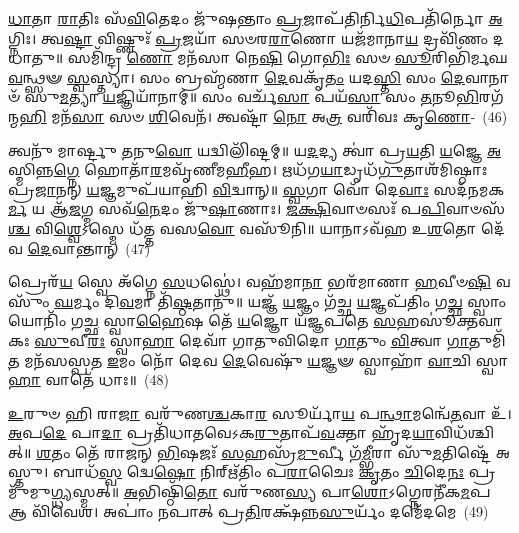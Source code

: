 {\anuvakamend[{\-\ul{𑌰𑍂}\-𑌪𑍇𑌣᳴ 𑌸\-\ul{𑌦}\-𑌸𑍍𑌯𑍈᳴\-\ul{𑌰}\-𑌷𑍍𑌟𑌾𑌦᳴𑌶 𑌚}]}%

\-\ul{𑌧𑌾}\-𑌤𑌾 \ul{𑌰𑌾}\-𑌤𑌿𑌃 𑌸᳴\-\ul{𑌵𑌿}\-𑌤𑍇𑌦𑌂 𑌜𑍁᳴𑌷𑌨𑍍𑌤𑌾𑌂 \ul{𑌪𑍍𑌰}\-𑌜𑌾𑌪᳴𑌤𑌿𑌰𑍍𑌨𑌿\-\ul{𑌧𑌿}\-𑌪𑌤𑌿᳴𑌰𑍍𑌨𑍋 \ul{𑌅}\-𑌗𑍍𑌨𑌿𑌃। 𑌤𑍍𑌵\-\ul{𑌷𑍍𑌟𑌾} 𑌵𑌿𑌷𑍍𑌣𑍁𑌃᳴ \ul{𑌪𑍍𑌰}\-𑌜𑌯𑌾᳴ 𑌸𑍞𑌰\-\ul{𑌰𑌾}\-𑌣𑍋 𑌯𑌜᳴𑌮𑌾𑌨𑌾\-\ul{𑌯} 𑌦𑍍𑌰𑌵𑌿᳴𑌣𑌂 𑌦𑌧𑌾𑌤𑍁॥ 𑌸𑌮𑌿᳴𑌨𑍍𑌦𑍍𑌰 \ul{𑌣𑍋} 𑌮𑌨᳴𑌸𑌾 𑌨𑍇\-\ul{𑌷𑌿} 𑌗𑍋\-\ul{𑌭𑌿𑌃} 𑌸𑍞 \ul{𑌸𑍂}\-𑌰𑌿𑌭𑌿᳴𑌰𑍍𑌮𑌘\-\ul{𑌵}\-𑌨𑍍𑌥𑍍𑌸𑍟 \ul{𑌸𑍍𑌵}\-𑌸𑍍𑌤𑍍𑌯𑌾। 𑌸𑌂 𑌬𑍍𑌰𑌹𑍍𑌮᳴𑌣𑌾 \ul{𑌦𑍇}\-𑌵𑌕𑍃᳴\-\ul{𑌤𑌂} 𑌯𑌦\-\ul{𑌸𑍍𑌤𑌿} 𑌸𑌂 \ul{𑌦𑍇}\-𑌵𑌾𑌨𑌾𑍞᳴ 𑌸𑍁\-\ul{𑌮}\-𑌤𑍍𑌯𑌾 \ul{𑌯}\-𑌜𑍍𑌞𑌿𑌯𑌾᳴𑌨𑌾𑌮𑍍॥ 𑌸𑌂 𑌵𑌰𑍍𑌚᳴\-\ul{𑌸𑌾} 𑌪𑌯᳴\-\ul{𑌸𑌾} 𑌸𑌂 \ul{𑌤}\-𑌨𑍂\-\ul{𑌭𑌿}\-𑌰𑌗᳴𑌨𑍍𑌮\-\ul{𑌹𑌿} 𑌮𑌨᳴\-\ul{𑌸𑌾} 𑌸𑍞 \ul{𑌶𑌿}\-𑌵𑍇𑌨᳴। 𑌤𑍍𑌵𑌷𑍍𑌟𑌾᳴ \ul{𑌨𑍋} 𑌅\-\ul{𑌤𑍍𑌰} 𑌵𑌰𑌿᳴𑌵𑌃 𑌕𑍃\-\ul{𑌣𑍋}\--~(46)

𑌤𑍍𑌵𑌨𑍁᳴ 𑌮𑌾𑌰𑍍𑌷𑍍𑌟𑍁 \ul{𑌤}\-𑌨𑍁\-\ul{𑌵𑍋} 𑌯𑌦𑍍𑌵𑌿𑌲𑌿᳴𑌷𑍍𑌟𑌮𑍍॥ 𑌯\-\ul{𑌦}\-𑌦𑍍𑌯 𑌤𑍍𑌵𑌾॑ 𑌪𑍍𑌰\-\ul{𑌯}\-𑌤𑌿 \ul{𑌯}\-𑌜𑍍𑌞𑍇 \ul{𑌅}\-𑌸𑍍𑌮𑌿𑌨𑍍𑌨\-\ul{𑌗𑍍𑌨𑍇} 𑌹𑍋𑌤𑌾᳴\-\ul{𑌰}\-𑌮𑌵𑍃᳴𑌣𑍀𑌮\-\ul{𑌹𑍀}\-𑌹। 𑌋𑌧᳴𑌗\-\ul{𑌯𑌾}\-𑌡𑍃𑌧᳴\-\ul{𑌗𑍁}\-𑌤𑌾𑌶᳴𑌮𑌿𑌷𑍍𑌠𑌾𑌃 𑌪𑍍𑌰\-\ul{𑌜𑌾}\-𑌨𑌨𑍍 \ul{𑌯}\-𑌜𑍍𑌞𑌮𑍁𑌪᳴𑌯𑌾𑌹𑌿 \ul{𑌵𑌿}\-𑌦𑍍𑌵𑌾𑌨𑍍॥ \ul{𑌸𑍍𑌵}\-𑌗𑌾 𑌵𑍋᳴ 𑌦𑍇\-\ul{𑌵𑌾𑌃} 𑌸𑌦᳴𑌨𑌮𑌕\-\ul{𑌰𑍍𑌮} 𑌯 𑌆᳴\-\ul{𑌜}\-𑌗𑍍𑌮 𑌸𑌵᳴\-\ul{𑌨𑍇}\-𑌦𑌂 𑌜𑍁᳴\-\ul{𑌷𑌾}\-𑌣𑌾𑌃। \ul{𑌜}\-\-\ul{𑌕𑍍𑌷𑌿}\-𑌵𑌾𑍞𑌸𑌃᳴ 𑌪\-\ul{𑌪𑌿}\-𑌵𑌾𑍞𑌸᳴\-\ul{𑌶𑍍𑌚} 𑌵𑌿\-\ul{𑌶𑍍𑌵𑍇}\-\-𑌽𑌸𑍍𑌮𑍇 𑌧᳴𑌤𑍍𑌤 𑌵𑌸\-\ul{𑌵𑍋} 𑌵𑌸𑍂᳴𑌨𑌿॥ 𑌯𑌾𑌨𑌾\-𑌽𑌵᳴𑌹 𑌉\-\ul{𑌶}\-𑌤𑍋 𑌦𑍇᳴𑌵 \ul{𑌦𑍇}\-𑌵𑌾𑌨𑍍𑌤𑌾𑌨𑍍~(47)

𑌪𑍍𑌰𑍇𑌰᳴\-\ul{𑌯} 𑌸𑍍𑌵𑍇 𑌅᳴𑌗𑍍𑌨𑍇 \ul{𑌸}\-𑌧𑌸𑍍𑌥𑍇॑। 𑌵𑌹᳴𑌮𑌾\-\ul{𑌨𑌾} 𑌭𑌰᳴𑌮𑌾𑌣𑌾 \ul{𑌹}\-𑌵𑍀𑍞\-\ul{𑌷𑌿} 𑌵𑌸𑍁𑌂᳴ \ul{𑌘}\-𑌰𑍍𑌮𑌂 𑌦𑌿\-\ul{𑌵}\-𑌮𑌾 𑌤𑌿᳴\-\ul{𑌷𑍍𑌠}\-𑌤𑌾𑌨𑍁᳴॥ 𑌯𑌜𑍍𑌞᳴ \ul{𑌯}\-𑌜𑍍𑌞𑌂 𑌗᳴𑌚𑍍𑌛 \ul{𑌯}\-𑌜𑍍𑌞𑌪᳴𑌤𑌿𑌂 𑌗\-\ul{𑌚𑍍𑌛} 𑌸𑍍𑌵𑌾𑌂 𑌯𑍋𑌨𑌿𑌂᳴ 𑌗\-\ul{𑌚𑍍𑌛} 𑌸𑍍𑌵𑌾\-\ul{𑌹𑍈}\-𑌷 𑌤𑍇᳴ \ul{𑌯}\-𑌜𑍍𑌞𑍋 𑌯᳴𑌜𑍍𑌞𑌪𑌤𑍇 \ul{𑌸}\-𑌹𑌸𑍂॑𑌕𑍍𑌤𑌵𑌾𑌕𑌃 \ul{𑌸𑍁}\-𑌵𑍀\-\ul{𑌰𑌃} 𑌸𑍍𑌵𑌾\-\ul{𑌹𑌾} 𑌦𑍇𑌵𑌾᳴ 𑌗𑌾𑌤𑍁𑌵𑌿𑌦𑍋 \ul{𑌗𑌾}\-𑌤𑍁𑌂 \ul{𑌵𑌿}\-𑌤𑍍𑌵𑌾 \ul{𑌗𑌾}\-𑌤𑍁𑌮𑌿᳴\-\ul{𑌤} 𑌮𑌨᳴𑌸𑌸𑍍𑌪𑌤 \ul{𑌇}\-𑌮𑌂 𑌨𑍋᳴ 𑌦𑍇𑌵 \ul{𑌦𑍇}\-𑌵𑍇𑌷𑍁᳴ \ul{𑌯}\-𑌜𑍍𑌞𑍟 𑌸𑍍𑌵𑌾𑌹𑌾᳴ \ul{𑌵𑌾}\-𑌚𑌿 𑌸𑍍𑌵𑌾\-\ul{𑌹𑌾} 𑌵𑌾𑌤𑍇᳴ 𑌧𑌾𑌃॥~(48)

{\anuvakamend[{\-\ul{𑌕𑍃}\-\-\ul{𑌣𑍋}\-\-\ul{𑌤𑍁} 𑌤𑌾\-\ul{𑌨}\-𑌷𑍍𑌟𑌾𑌚᳴𑌤𑍍𑌵𑌾𑌰𑌿𑍞𑌶𑌚𑍍𑌚}]}%

\-\ul{𑌉}\-𑌰𑍁𑍞 𑌹𑌿 𑌰𑌾\-\ul{𑌜𑌾} 𑌵𑌰𑍁᳴𑌣\-\ul{𑌶𑍍𑌚}\-𑌕𑌾\-\ul{𑌰} 𑌸𑍂𑌰𑍍𑌯𑌾᳴\-\ul{𑌯} 𑌪\-\ul{𑌨𑍍𑌥𑌾}\-𑌮𑌨𑍍𑌵𑍇᳴\-\ul{𑌤}\-𑌵𑌾 𑌉᳴। \ul{𑌅}\-𑌪\-\ul{𑌦𑍇} 𑌪𑌾\-\ul{𑌦𑌾} 𑌪𑍍𑌰𑌤𑌿᳴𑌧𑌾𑌤𑌵𑍇\-𑌽𑌕\-\ul{𑌰𑍁}\-𑌤𑌾𑌪᳴\-\ul{𑌵}\-𑌕𑍍𑌤𑌾 𑌹𑍃᳴𑌦\-\ul{𑌯𑌾}\-𑌵𑌿𑌧᳴𑌶𑍍𑌚𑌿𑌤𑍍॥ \ul{𑌶}\-𑌤𑌂 𑌤𑍇᳴ 𑌰𑌾𑌜𑌨𑍍 \ul{𑌭𑌿}\-𑌷𑌜𑌃᳴ \ul{𑌸}\-𑌹𑌸𑍍𑌰᳴\-\ul{𑌮𑍁}\-𑌰𑍍𑌵𑍀 𑌗᳴\-\ul{𑌮𑍍𑌭𑍀}\-𑌰𑌾 𑌸𑍁᳴\-\ul{𑌮}\-𑌤𑌿𑌷𑍍𑌟𑍇᳴ 𑌅𑌸𑍍𑌤𑍁। 𑌬𑌾𑌧᳴\-\ul{𑌸𑍍𑌵} 𑌦𑍍𑌵𑍇\-\ul{𑌷𑍋} 𑌨𑌿𑌰𑍍\mbox{}𑌋᳴𑌤𑌿𑌂 𑌪\-\ul{𑌰𑌾}\-𑌚𑍈𑌃 \ul{𑌕𑍃}\-𑌤𑌂 \ul{𑌚𑌿}\-𑌦𑍇\-\ul{𑌨𑌃} 𑌪𑍍𑌰 𑌮𑍁᳴𑌮𑍁\-\ul{𑌗𑍍𑌧𑍍𑌯}\-𑌸𑍍𑌮𑌤𑍍॥ \ul{𑌅}\-𑌭𑌿𑌷𑍍𑌠𑌿᳴\-\ul{𑌤𑍋} 𑌵𑌰𑍁᳴𑌣\-\ul{𑌸𑍍𑌯} 𑌪𑌾\-\ul{𑌶𑍋}\-\-𑌽𑌗𑍍𑌨𑍇𑌰𑌨𑍀᳴𑌕\-\ul{𑌮}\-𑌪 𑌆 𑌵𑌿᳴𑌵𑍇𑌶। 𑌅𑌪𑌾𑌂॑ 𑌨𑌪𑌾𑌤𑍍 𑌪𑍍𑌰\-\ul{𑌤𑌿}\-𑌰𑌕𑍍𑌷᳴𑌨𑍍𑌨\-\ul{𑌸𑍁}\-𑌰𑍍𑌯𑌂᳴ 𑌦𑌮𑍇᳴𑌦𑌮𑍇~(49)

